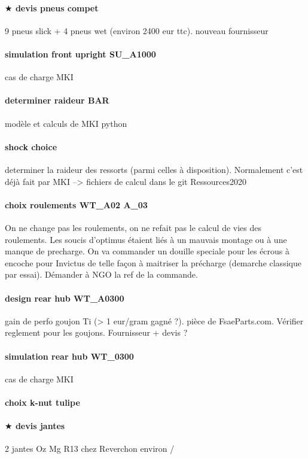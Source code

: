 \paragraph{$\bigstar$ devis pneus compet} 9 pneus slick + 4 pneus wet (environ 2400 eur ttc). nouveau fournisseur
\paragraph{simulation front upright SU\_A1000} cas de charge MKI
\paragraph{determiner raideur BAR} modèle et calculs de MKI python
\paragraph{shock choice} determiner la raideur des ressorts (parmi celles à disposition). Normalement c'est déjà fait par MKI --> fichiers de calcul dans le git Ressources2020 
\paragraph{choix roulements WT\_A02 A\_03} On ne change pas les roulements, on ne refait pas le calcul de vies des roulements. Les soucis d'optimus étaient liés à un mauvais montage ou à une manque de precharge. On va commander un douille speciale pour les écrous à encoche pour Invictus de telle façon à maitriser la précharge (demarche classique par essai). Démander à NGO la ref de la commande.
\paragraph{design rear hub WT\_A0300} gain de perfo goujon Ti (> 1 eur/gram gagné ?). pièce de FsaeParts.com. Vérifier reglement pour les goujons. Fournisseur + devis ?
\paragraph{simulation rear hub WT\_0300} cas de charge MKI
\paragraph{choix k-nut tulipe} 
\paragraph{$\bigstar$ devis jantes} 2 jantes Oz Mg R13 chez Reverchon environ /%
